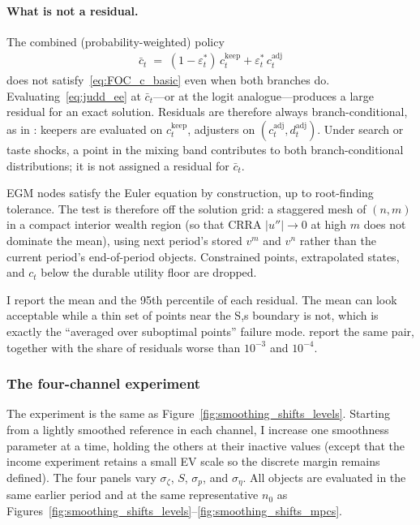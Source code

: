 \paragraph{What is not a residual.}
The combined (probability-weighted) policy
\begin{align}
	\bar c_t
	\;=\;
	(1-\varepsilon_t^{\ast})\,c_t^{\mathrm{keep}}
	+ \varepsilon_t^{\ast}\,c_t^{\mathrm{adj}}
\end{align}
does not satisfy~\eqref{eq:FOC_c_basic} even when both branches do. Evaluating~\eqref{eq:judd_ee} at $\bar c_t$---or at the logit analogue---produces a large residual for an exact solution. Residuals are therefore always branch-conditional, as in \citet{Dobrescu2022-ii}: keepers are evaluated on $c_t^{\mathrm{keep}}$, adjusters on $(c_t^{\mathrm{adj}},d_t^{\mathrm{adj}})$. Under search or taste shocks, a point in the mixing band contributes to both branch-conditional distributions; it is not assigned a residual for $\bar c_t$.

EGM nodes satisfy the Euler equation by construction, up to root-finding tolerance. The test is therefore off the solution grid: a staggered mesh of $(n,m)$ in a compact interior wealth region (so that CRRA $\lvert u''\rvert\to 0$ at high $m$ does not dominate the mean), using next period's stored $v^{m}$ and $v^{n}$ rather than the current period's end-of-period objects. Constrained points, extrapolated states, and $c_t$ below the durable utility floor are dropped.

I report the mean and the 95th percentile of each residual. The mean can look acceptable while a thin set of points near the S,s boundary is not, which is exactly the ``averaged over suboptimal points'' failure mode. \citet{Dobrescu2022-ii} report the same pair, together with the share of residuals worse than $10^{-3}$ and $10^{-4}$.

\subsubsection{The four-channel experiment}

The experiment is the same as Figure~\ref{fig:smoothing_shifts_levels}. Starting from a lightly smoothed reference in each channel, I increase one smoothness parameter at a time, holding the others at their inactive values (except that the income experiment retains a small EV scale so the discrete margin remains defined). The four panels vary $\sigma_\zeta$, $S$, $\sigma_p$, and $\sigma_\eta$. All objects are evaluated in the same earlier period and at the same representative $n_0$ as Figures~\ref{fig:smoothing_shifts_levels}--\ref{fig:smoothing_shifts_mpcs}.


